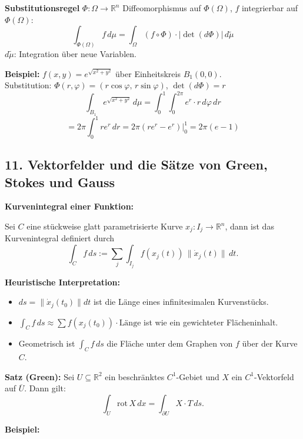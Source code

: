\vspace{0.5em}
\textbf{Substitutionsregel}
\( \Phi : \Omega \to \mathbb{R}^n \) Diffeomorphismus auf \( \Phi(\Omega) \), \( f \) integrierbar auf \( \Phi(\Omega) \):
\[
\int_{\Phi(\Omega)} f\,d\mu =
\int_\Omega (f \circ \Phi) \cdot |\det(d\Phi)|\,d\tilde{\mu}
\]
\( d\tilde{\mu} \): Integration über neue Variablen.

\vspace{0.5em}
\textbf{Beispiel:} \( f(x,y) = e^{\sqrt{x^2 + y^2}} \) über Einheitskreis \( B_1(0,0) \). \\
Substitution: \( \Phi(r,\varphi) = (r\cos\varphi,\, r\sin\varphi) \), \( \det(d\Phi) = r \)
\[
\int_{B_1} e^{\sqrt{x^2+y^2}}\,d\mu
= \int_0^1 \int_0^{2\pi} e^r \cdot r\,d\varphi\,dr
\]
\[
= 2\pi \int_0^1 r e^r\,dr
= 2\pi \left( re^r - e^r \right)\big|_0^1 = 2\pi(e - 1)
\]

\subsection{11. Vektorfelder und die 
Sätze von Green, Stokes und Gauss}

\textbf{Kurvenintegral einer Funktion:}

Sei $C$ eine stückweise glatt parametrisierte Kurve $x_j : I_j \to \mathbb{R}^n$, dann ist das Kurvenintegral definiert durch
\[
\int_C f \, ds := \sum_j \int_{I_j} f(x_j(t)) \, \lVert \dot{x}_j(t) \rVert \, dt.
\]

\textbf{Heuristische Interpretation:}

\begin{itemize}
  \item $ds = \lVert \dot{x}_j(t_0) \rVert dt$ ist die Länge eines infinitesimalen Kurvenstücks.
  \item $\int_C f \, ds \approx \sum f(x_j(t_0)) \cdot \text{Länge}$ ist wie ein gewichteter Flächeninhalt.
  \item Geometrisch ist $\int_C f \, ds$ die Fläche unter dem Graphen von $f$ über der Kurve $C$.
\end{itemize}

\textbf{Satz (Green):}
Sei $U \subseteq \mathbb{R}^2$ ein beschränktes $C^1$-Gebiet und $X$ ein $C^1$-Vektorfeld auf $\overline{U}$. Dann gilt:
\[
\int_U \mathrm{rot}\, X \, dx = \int_{\partial U} X \cdot T \, ds.
\]

\textbf{Beispiel:}

